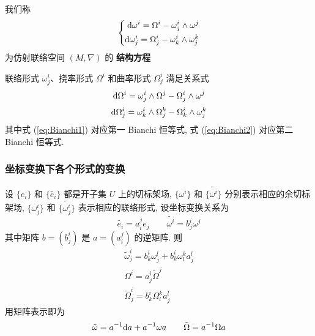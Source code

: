         \begin{definition}[结构方程]
            我们称
            \begin{equation}
                \left\{
                \begin{aligned}
                    {\rm d}\omega^i = \Omega^i-\omega^i_j\wedge\omega^j \\
                    {\rm d}\omega^i_j = \Omega^i_j-\omega^i_k\wedge\omega^k_j
                \end{aligned}
                \right.
            \end{equation}
            为仿射联络空间 $(M,\nabla)$ 的 \textbf{结构方程}
        \end{definition}

        \begin{theorem}[第一、第二Bianchi恒等式]
            联络形式 $\omega^i_j$、挠率形式 $\Omega^i$ 和曲率形式 $\Omega^i_j$ 满足关系式
            \begin{equation} \label{eq:Bianchi1}
                {\rm d}\Omega^i = \omega^i_j\wedge\Omega^j-\Omega^i_j\wedge\omega^j
            \end{equation}
            \begin{equation} \label{eq:Bianchi2}
                {\rm d}\Omega^i_j = \omega^i_k\wedge\Omega^k_j-\Omega^i_k\wedge\omega^k_j
            \end{equation}
            其中式 (\ref{eq:Bianchi1}) 对应第一 \rm{Bianchi} 恒等式, 式 (\ref{eq:Bianchi2}) 对应第二 \rm{Bianchi} 恒等式.
        \end{theorem}
    \subsubsection{坐标变换下各个形式的变换}
        设 $\{e_i\}$ 和 $\{\tilde{e_i}\}$ 都是开子集 $U$ 上的切标架场, $\{\omega^i\}$ 和 $\{\tilde{\omega^i}\}$ 分别表示相应的余切标架场,
        $\{\omega^i_j\}$ 和 $\{\tilde{\omega^i_j}\}$ 表示相应的联络形式, 设坐标变换关系为
        \begin{equation*}
            \tilde{e_i} = a^j_ie_j\qquad \tilde{\omega^i} = b^i_j\omega^j
        \end{equation*}
        其中矩阵 $b = (b^i_j)$ 是 $a = (a^j_i)$ 的逆矩阵.
        则
        \begin{gather*}
            \tilde{\omega}^i_j = b^i_k\omega^l_j+b^i_k\omega^k_la^l_j \\
            \Omega^i = a^i_j\tilde{\Omega}^j \\
            \tilde{\Omega}^i_j = b^i_k\Omega^k_la^l_j
        \end{gather*}
        用矩阵表示即为
        \begin{equation*}
            \tilde{\omega} = a^{-1}{\rm d} a + a^{-1}\omega a \qquad \tilde{\Omega} = a^{-1}\Omega a
        \end{equation*}
